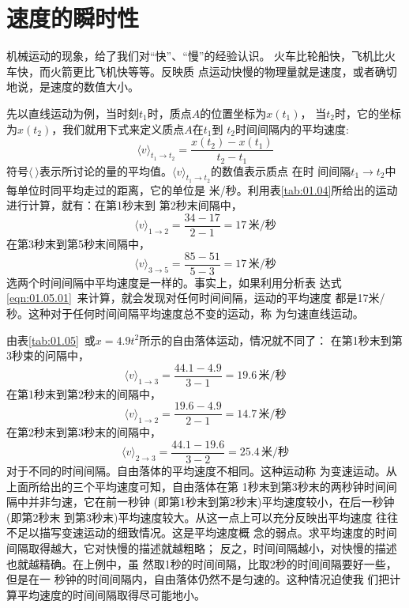 \section{速度的瞬时性}\label{sec:01.06}

机械运动的现象，给了我们对“快”、“慢”的经验认识。
火车比轮船快，飞机比火车快，而火箭更比飞机快等等。反映质
点运动快慢的物理量就是速度，或者确切地说，是速度的数值大小。

先以直线运动为例，当时刻$ t_1 $时，质点$ A $的位置坐标为$ x\left(t_1\right) $，
当$ t_2 $时，它的坐标为$ x\left(t_2\right) $，我们就用下式来定义质点$ A $在$ t_1 $到
$ t_2 $时间间隔内的平均速度:
\begin{equation}
  \langle v\rangle_{t_{1} \rightarrow t_{2}}=\frac{x\left(t_{2}\right)-x\left(t_{1}\right)}{t_{2}-t_{1}} \label{eqn:01.06.01}
\end{equation}
符号$\langle ~ \rangle$表示所讨论的量的平均值。$\langle v\rangle_{t_{1} \rightarrow t_{2}}$的数值表示质点
在时
\clearpage
\noindent 间间隔$t_{1} \rightarrow t_{2}$中每单位时同平均走过的距离，它的单位是
米/秒。利用表\ref{tab:01.04}所给出的运动进行计算，就有：在第1秒末到
第2秒末间隔中，
\begin{equation*}
  \langle v\rangle_{1 \rightarrow 2}=\frac{34-17}{2-1}=17\,\text{米/秒}
\end{equation*}
在第3秒末到第5秒末间隔中，
\begin{equation*}
  \langle v\rangle_{3 \rightarrow 5}=\frac{85-51}{5-3}=17\,\text{米/秒}
\end{equation*}
选两个时间间隔中平均速度是一样的。事实上，如果利用分析表
达式\eqref{eqn:01.05.01}~来计算，就会发现对任何时间间隔，运动的平均速度
都是17米/秒。这种对于任何时间间隔平均速度总不变的运动，称
为匀速直线运动。

由表\ref{tab:01.05}~或$x=4.9t^2$所示的自由落体运动，情况就不同了：
在第1秒末到第3秒束的问隔中，
\begin{equation*}
  \langle v\rangle_{1 \rightarrow 3}=\frac{44.1-4.9}{3-1}=19.6\,\text{米/秒}
\end{equation*}
在第1秒末到第2秒末的间隔中，
\begin{equation*}
  \langle v\rangle_{1 \rightarrow 2}=\frac{19.6-4.9}{2-1}=14.7\,\text{米/秒}
\end{equation*}
在第2秒末到第3秒末的间隔中，
\begin{equation*}
  \langle v\rangle_{2 \rightarrow 3}=\frac{44.1-19.6}{3-2}=25.4\,\text{米/秒}
\end{equation*}
对于不同的时间间隔。自由落体的平均速度不相同。这种运动称
为变速运动。从上面所给出的三个平均速度可知，自由落体在第
1秒末到第3秒末的两秒钟时间间隔中并非匀速，它在前一秒钟
(即第1秒末到第2秒末)平均速度较小，在后一秒钟(即第2秒末
到第3秒末)平均速度较大。从这一点上可以充分反映出平均速度
往往不足以描写变速运动的细致情况。这是平均速度概
念的弱点。求平均速度的时间间隔取得越大，它对快慢的描述就越粗略；
反之，时间间隔越小，对快慢的描述也就越精确。在上例中，虽
然取1秒的时间间隔，比取2秒的时间间隔要好一些，但是在一
秒钟的时间间隔内，自由落体仍然不是匀速的。这种情况迫使我
们把计算平均速度的时间间隔取得尽可能地小。

